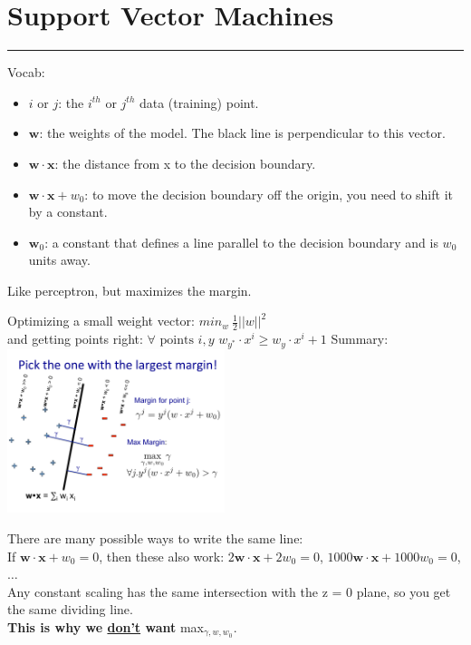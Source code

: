 \section{Support Vector Machines}
\smallskip \hrule height 2pt \smallskip

Vocab: 
\begin{itemize}
	\item $i$ or $j$: the $i^{th}$ or $j^{th}$ data (training) point. 
	\item $\bm{w}$: the weights of the model.  The black line is perpendicular to this vector. 
	\item $\bm{w} \cdot \bm{x}$: the distance from x to the decision boundary. 
	\item $\bm{w} \cdot \bm{x} + w_0$: to move the decision boundary off the origin, you need to shift it by a constant.  
	\item $\bm{w}_0$: a constant that defines a line parallel to the decision boundary and is $w_0$ units away. 
\end{itemize}

Like perceptron, but maximizes the margin.  

Optimizing a small weight vector: $\displaystyle min_w \: \frac{1}{2}||w||^2$ \hfill  \\  %
and getting points right: $\forall \mbox { points } i, y$  $w_{y^*} \cdot x^i \geq w_y \cdot x^i + 1$
Summary:
\includegraphics[width=2.5in]{figures/svm_overview.pdf}

There are many possible ways to write the same line: \hfill \\
If $\bm{w} \cdot \bm{x} + w_0 = 0$, then these also work: 
$2\bm{w} \cdot \bm{x} + 2w_0 = 0$, $1000\bm{w} \cdot \bm{x} + 1000w_0 = 0$, $\dots$ \hfill \\
Any constant scaling has the same intersection with the z = 0 plane, so you get the same dividing line. \hfill \\
\textbf{This is why we \underline{don't} want} max$_{\gamma, w, w_0}$. \hfill \\  \hfill \\

